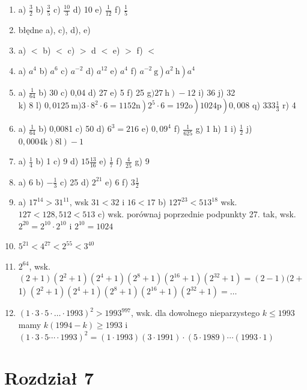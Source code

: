 \documentclass[10pt]{article}
\begin{document}
\begin{enumerate}
  \item a) \(\frac{3}{2}\) b) \(\frac{3}{5}\) c) \(\frac{10}{3}\) d) 10 e) \(\frac{1}{12}\) f) \(\frac{1}{5}\)
  \item błędne a), c), d), e)
  \item a) \(<\) b) \(<\) c) \(>\) d \(<\) e) \(>\) f) \(<\)
  \item a) \(a^{4}\) b) \(a^{6}\) c) \(a^{-2}\) d) \(a^{12}\) e) \(a^{4}\) f) \(\left.\left.a^{-2} \mathrm{~g}\right) a^{2} \mathrm{~h}\right) a^{4}\)
  \item a) \(\frac{1}{64}\) b) 30 c) 0,04 d) 27 e) 5 f) 25 g\(\left.) 27 \mathrm{~h}\right)-12\) i) 36 j) 32\\
k) 8 l) \(\left.\left.\left.0,0125 \mathrm{~m}) 3 \cdot 8^{2} \cdot 6=1152 \mathrm{n}\right) 2^{5} \cdot 6=192 \mathrm{o}\right) 1024 \mathrm{p}\right) 0,008\) q) \(333 \frac{1}{3}\) r) 4
  \item a) \(\frac{1}{64}\) b) 0,0081 c) 50 d) \(6^{3}=216\) e) \(0,09^{4}\) f) \(\frac{1}{625}\) g) 1 h) 1 i) \(\frac{1}{2}\) j) \(\left.\left.0,0004 \mathrm{k}\right) 8 \mathrm{l}\right)-1\)
  \item a) \(\frac{1}{4}\) b) 1 c) 9 d) \(15 \frac{13}{16}\) e) \(\frac{1}{7}\) f) \(\frac{4}{25}\) g) 9
  \item a) 6 b) \(-\frac{1}{3}\) c) 25 d) \(2^{21}\) e) 6 f) \(3 \frac{1}{2}\)
  \item a) \(17^{14}>31^{11}\), wsk \(31<32\) i \(16<17\) b) \(127^{23}<513^{18}\) wsk. \(127<128,512<513\) c) wsk. porównaj poprzednie podpunkty 27. tak, wsk. \(2^{20}=2^{10} \cdot 2^{10}\) i \(2^{10}=1024\)
  \item \(5^{21}<4^{27}<2^{55}<3^{40}\)
  \item \(2^{64}\), wsk. \((2+1)\left(2^{2}+1\right)\left(2^{4}+1\right)\left(2^{8}+1\right)\left(2^{16}+1\right)\left(2^{32}+1\right)=(2-1)(2+\) 1) \(\left(2^{2}+1\right)\left(2^{4}+1\right)\left(2^{8}+1\right)\left(2^{16}+1\right)\left(2^{32}+1\right)=\ldots\)
  \item \((1 \cdot 3 \cdot 5 \cdot \ldots \cdot 1993)^{2}>1993^{997}\), wsk. dla dowolnego nieparzystego \(k \leqslant 1993\) mamy \(k(1994-k) \geqslant 1993\) i\\
\((1 \cdot 3 \cdot 5 \cdots \cdot 1993)^{2}=(1 \cdot 1993)(3 \cdot 1991) \cdot(5 \cdot 1989) \cdots(1993 \cdot 1)\)
\end{enumerate}

\section*{Rozdział 7}
\end{document}
